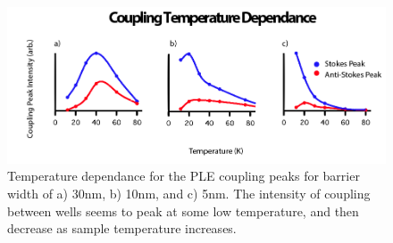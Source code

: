 \begin{figure}
\centering
\includegraphics[width = \textwidth]{crosspeakT.png}
\caption{ \doublespacing Temperature dependance for the PLE coupling peaks for barrier width of a) 30nm, b) 10nm, and c) 5nm. The intensity of coupling between wells seems to peak at some low temperature, and then decrease as sample temperature increases.} 
\label{xpkintensity}
\end{figure}
